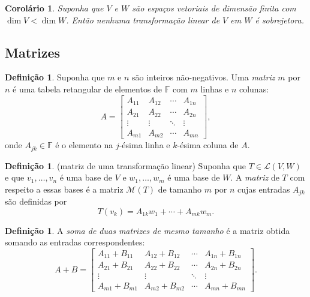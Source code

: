 \documentclass[12pt]{article}
\theoremstyle{plain}
\newtheorem{cor}[thm]{Corolário}
\theoremstyle{definition}
\newtheorem{defn}[thm]{Definição}
\theoremstyle{remark}
\begin{document}
\begin{cor}
    Suponha que \(V\) e \(W\) são espaços vetoriais de dimensão finita com \(\dim V < \dim W\). Então nenhuma transformação linear de \(V\) em \(W\) é sobrejetora.
\end{cor}

\subsection{Matrizes}
\begin{defn}
    Suponha que \(m\) e \(n\) são inteiros não-negativos. Uma \emph{matriz} \(m\) por \(n\) é uma tabela retangular de elementos de \(\mathbb{F}\) com \(m\) linhas e \(n\) colunas:
    \[
        A = \begin{bmatrix}
            A_{11} & A_{12} & \cdots & A_{1n} \\
            A_{21} & A_{22} & \cdots & A_{2n} \\
            \vdots & \vdots & \ddots & \vdots \\
            A_{m1} & A_{m2} & \cdots & A_{mn}
        \end{bmatrix},
    \]
    \noindent onde \(A_{jk} \in \mathbb{F}\) é o elemento na \(j\)-ésima linha e \(k\)-ésima coluna de \(A\).
\end{defn}

\begin{defn} (matriz de uma transformação linear)
    Suponha que \(T \in \mathcal{L}(V, W)\) e que \(v_1, \ldots, v_n\) é uma base de \(V\) e \(w_1, \ldots, w_m\) é uma base de \(W\). A \emph{matriz} de \(T\) com respeito a essas bases é a matriz \(\mathcal{M}(T)\) de tamanho \(m\) por \(n\) cujas entradas \(A_{jk}\) são definidas por
    \[
        T(v_k) = A_{1k} w_1 + \cdots + A_{mk} w_m.
    \]    
\end{defn}

\begin{defn}
    A \emph{soma de duas matrizes de mesmo tamanho} é a matriz obtida somando as entradas correspondentes:
    \[
        A + B = \begin{bmatrix}
            A_{11} + B_{11} & A_{12} + B_{12} & \cdots & A_{1n} + B_{1n} \\
            A_{21} + B_{21} & A_{22} + B_{22} & \cdots & A_{2n} + B_{2n} \\
            \vdots & \vdots & \ddots & \vdots \\
            A_{m1} + B_{m1} & A_{m2} + B_{m2} & \cdots & A_{mn} + B_{mn}
        \end{bmatrix}.
    \]
\end{defn}
\end{document}
